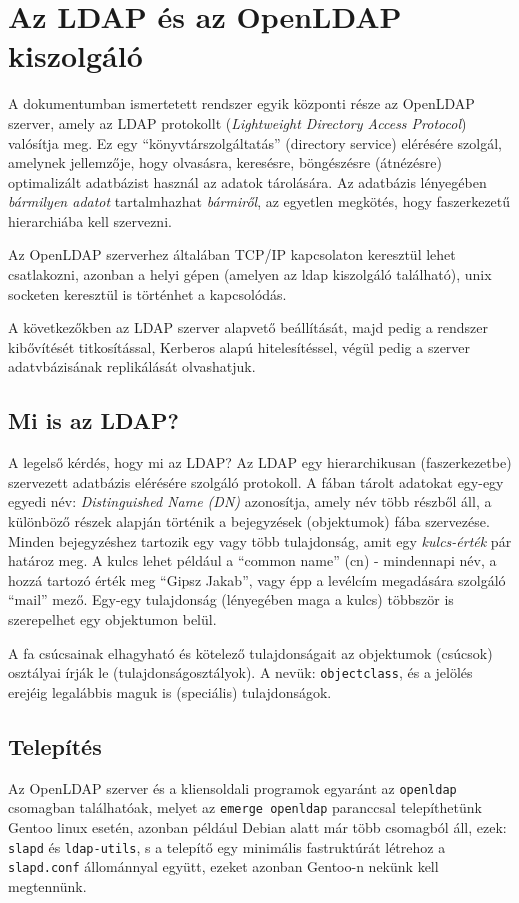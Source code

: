 \chapter{Az LDAP és az OpenLDAP kiszolgáló}

A dokumentumban ismertetett rendszer egyik központi része az OpenLDAP szerver, amely az LDAP protokollt ({\em Lightweight
  Directory Access Protocol}) valósítja meg. Ez egy ``könyvtárszolgáltatás''
(directory service) elérésére szolgál, amelynek jellemzője, hogy olvasásra, keresésre, böngészésre (átnézésre)
optimalizált adatbázist használ az adatok tárolására. Az adatbázis lényegében \emph{bármilyen adatot} tartalmhazhat
\emph{bármiről}, az egyetlen megkötés, hogy faszerkezetű hierarchiába kell szervezni.

Az OpenLDAP szerverhez általában TCP/IP kapcsolaton keresztül lehet csatlakozni, azonban a helyi gépen (amelyen az
ldap kiszolgáló található), unix socketen keresztül is történhet a kapcsolódás.

A következőkben az LDAP szerver alapvető beállítását, majd pedig a rendszer kibővítését titkosítással,
Kerberos alapú hitelesítéssel, végül pedig a szerver adatvbázisának replikálását olvashatjuk.
\section{Mi is az LDAP?}

A legelső kérdés, hogy mi az LDAP?
Az LDAP egy hierarchikusan (faszerkezetbe) szervezett adatbázis elérésére szolgáló protokoll. A fában tárolt adatokat
egy-egy egyedi név: {\em Distinguished Name (DN)} azonosítja, amely név több részből áll, a  különböző részek alapján
történik a bejegyzések (objektumok) fába szervezése. Minden bejegyzéshez tartozik egy vagy több
tulajdonság, amit egy {\em kulcs-érték} pár határoz meg. A kulcs lehet például a ``common name'' (cn) - mindennapi
név, a hozzá tartozó érték meg ``Gipsz Jakab'', vagy épp a levélcím megadására szolgáló ``mail'' mező. Egy-egy
tulajdonság (lényegében maga a kulcs) többször is szerepelhet egy objektumon belül.

A fa csúcsainak elhagyható és kötelező tulajdonságait az objektumok (csúcsok) osztályai írják le
(tulajdonságosztályok). A nevük: \texttt{objectclass}, és a jelölés erejéig legalábbis  maguk is (speciális)
tulajdonságok.


\section{Telepítés}
Az OpenLDAP szerver és a kliensoldali programok egyaránt az \texttt{openldap} csomagban találhatóak, melyet az
\texttt{emerge openldap} paranccsal telepíthetünk Gentoo linux esetén, azonban például Debian alatt már több csomagból
áll, ezek: \texttt{slapd} és \texttt{ldap-utils}, s a telepítő egy minimális fastruktúrát létrehoz a \texttt{slapd.conf}
állománnyal együtt, ezeket azonban Gentoo-n nekünk kell megtennünk.

